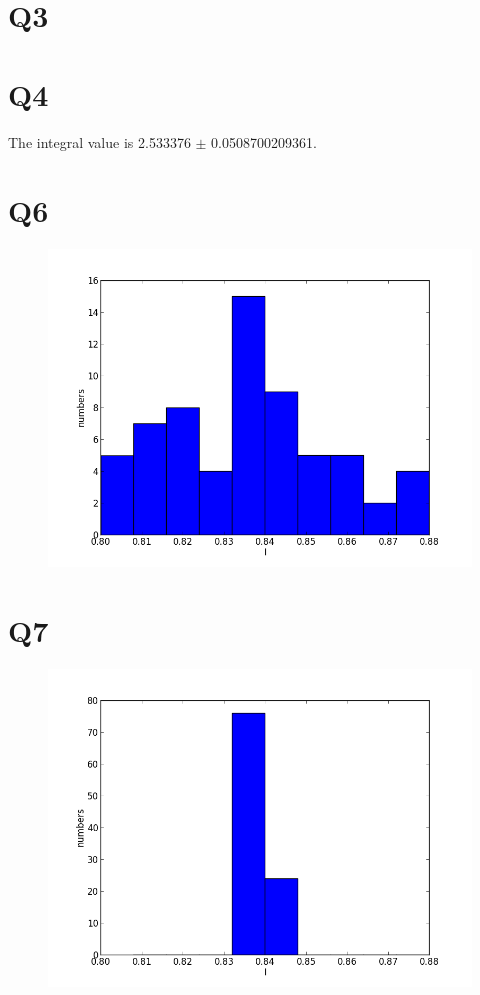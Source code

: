 \documentclass[letterpaper,12pt]{article}
\begin{document}
\section*{Q3}

\section*{Q4}
The integral value is 2.533376 $\pm$ 0.0508700209361.


\section*{Q6}

\FloatBarrier
\begin{figure}[H]
\centering
\includegraphics[scale=0.55]{q6.png}
\caption{}
\end{figure}
\FloatBarrier

\section*{Q7}

\FloatBarrier
\begin{figure}[H]
\centering
\includegraphics[scale=0.55]{q7.png}
\caption{}
\end{figure}
\FloatBarrier
\end{document}
